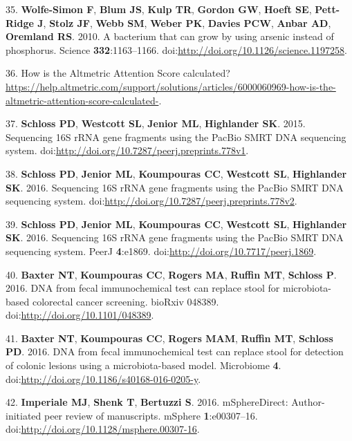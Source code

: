 \documentclass[11pt,]{article}
\begin{document}
35. \textbf{Wolfe-Simon F}, \textbf{Blum JS}, \textbf{Kulp TR},
\textbf{Gordon GW}, \textbf{Hoeft SE}, \textbf{Pett-Ridge J},
\textbf{Stolz JF}, \textbf{Webb SM}, \textbf{Weber PK}, \textbf{Davies
PCW}, \textbf{Anbar AD}, \textbf{Oremland RS}. 2010. A bacterium that
can grow by using arsenic instead of phosphorus. Science
\textbf{332}:1163--1166.
doi:\url{http://doi.org/10.1126/science.1197258}.

36. How is the Altmetric Attention Score calculated?
\url{https://help.altmetric.com/support/solutions/articles/6000060969-how-is-the-altmetric-attention-score-calculated-}.

37. \textbf{Schloss PD}, \textbf{Westcott SL}, \textbf{Jenior ML},
\textbf{Highlander SK}. 2015. Sequencing 16S rRNA gene fragments using
the PacBio SMRT DNA sequencing system.
doi:\url{http://doi.org/10.7287/peerj.preprints.778v1}.

38. \textbf{Schloss PD}, \textbf{Jenior ML}, \textbf{Koumpouras CC},
\textbf{Westcott SL}, \textbf{Highlander SK}. 2016. Sequencing 16S rRNA
gene fragments using the PacBio SMRT DNA sequencing system.
doi:\url{http://doi.org/10.7287/peerj.preprints.778v2}.

39. \textbf{Schloss PD}, \textbf{Jenior ML}, \textbf{Koumpouras CC},
\textbf{Westcott SL}, \textbf{Highlander SK}. 2016. Sequencing 16S rRNA
gene fragments using the PacBio SMRT DNA sequencing system. PeerJ
\textbf{4}:e1869. doi:\url{http://doi.org/10.7717/peerj.1869}.

40. \textbf{Baxter NT}, \textbf{Koumpouras CC}, \textbf{Rogers MA},
\textbf{Ruffin MT}, \textbf{Schloss P}. 2016. DNA from fecal
immunochemical test can replace stool for microbiota-based colorectal
cancer screening. bioRxiv 048389.
doi:\url{http://doi.org/10.1101/048389}.

41. \textbf{Baxter NT}, \textbf{Koumpouras CC}, \textbf{Rogers MAM},
\textbf{Ruffin MT}, \textbf{Schloss PD}. 2016. DNA from fecal
immunochemical test can replace stool for detection of colonic lesions
using a microbiota-based model. Microbiome \textbf{4}.
doi:\url{http://doi.org/10.1186/s40168-016-0205-y}.

42. \textbf{Imperiale MJ}, \textbf{Shenk T}, \textbf{Bertuzzi S}. 2016.
mSphereDirect: Author-initiated peer review of manuscripts. mSphere
\textbf{1}:e00307--16.
doi:\url{http://doi.org/10.1128/msphere.00307-16}.
\end{document}
